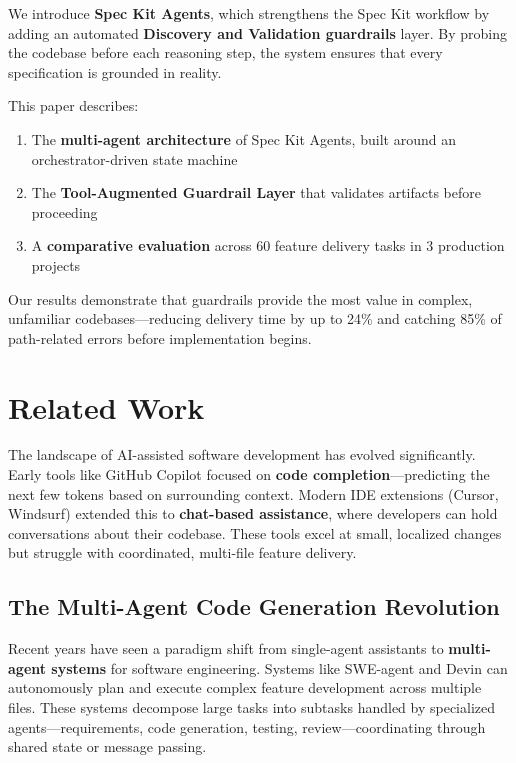 \documentclass[sigconf,anonymous,review]{acmart}
\begin{document}
We introduce \textbf{Spec Kit Agents}, which strengthens the Spec Kit workflow by adding an automated \textbf{Discovery and Validation guardrails} layer. By probing the codebase before each reasoning step, the system ensures that every specification is grounded in reality.

This paper describes:

\begin{enumerate}
  \item The \textbf{multi-agent architecture} of Spec Kit Agents, built around an orchestrator-driven state machine
  \item The \textbf{Tool-Augmented Guardrail Layer} that validates artifacts before proceeding
  \item A \textbf{comparative evaluation} across 60 feature delivery tasks in 3 production projects
\end{enumerate}

Our results demonstrate that guardrails provide the most value in complex, unfamiliar codebases---reducing delivery time by up to 24\% and catching 85\% of path-related errors before implementation begins.

\section{Related Work}

The landscape of AI-assisted software development has evolved significantly. Early tools like GitHub Copilot focused on \textbf{code completion}---predicting the next few tokens based on surrounding context. Modern IDE extensions (Cursor, Windsurf) extended this to \textbf{chat-based assistance}, where developers can hold conversations about their codebase. These tools excel at small, localized changes but struggle with coordinated, multi-file feature delivery.

\subsection{The Multi-Agent Code Generation Revolution}

Recent years have seen a paradigm shift from single-agent assistants to \textbf{multi-agent systems} for software engineering. Systems like SWE-agent and Devin can autonomously plan and execute complex feature development across multiple files. These systems decompose large tasks into subtasks handled by specialized agents---requirements, code generation, testing, review---coordinating through shared state or message passing.
\end{document}

